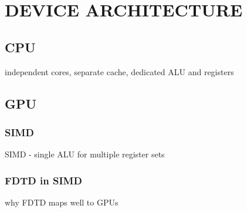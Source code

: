 \chapter{DEVICE ARCHITECTURE} \label{ch:device architecture}

\section{CPU}
independent cores, separate cache, dedicated ALU and registers

\section{GPU}
\subsection{SIMD}
SIMD - single ALU for multiple register sets
\subsection{FDTD in SIMD}
why FDTD maps well to GPUs



